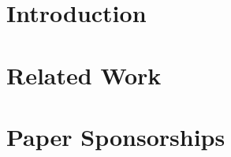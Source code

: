 \documentclass{article}
\begin{document}
\section{Introduction}

\section{Related Work}



\section{Paper Sponsorships}


\end{document}
